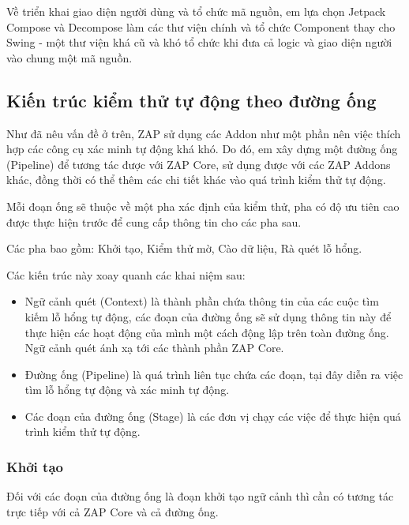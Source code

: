 \documentclass[./../main.tex]{subfiles}
\begin{document}
Về triển khai giao diện người dùng và tổ chức mã nguồn, em lựa chọn
Jetpack Compose và Decompose làm các thư viện chính và tổ chức Component
thay cho Swing - một thư viện khá cũ và khó tổ chức khi đưa cả logic và
giao diện người vào chung một mã nguồn.

\subsection{Kiến trúc kiểm thử tự động theo đường ống}
Như đã nêu vấn đề ở trên, ZAP sử dụng các Addon như một phần nên việc
thích hợp các công cụ xác minh tự động khá khó. Do đó, em xây dựng một
đường ống (Pipeline) để tương tác được với ZAP Core, sử dụng được với các
ZAP Addons khác, đồng thời có thể thêm các chi tiết khác vào quá trình kiểm
thử tự động.

Mỗi đoạn ống sẽ thuộc về một pha xác định của kiểm thử, pha có độ ưu tiên
cao được thực hiện trước để cung cấp thông tin cho các pha sau.

Các pha bao gồm: Khởi tạo, Kiểm thử mờ, Cào dữ liệu, Rà quét lỗ hổng.

Các kiến trúc này xoay quanh các khai niệm sau:
\begin{itemize}
	\item Ngữ cảnh quét (Context) là thành phần chứa thông tin của các cuộc
	      tìm kiếm lỗ hổng tự động, các đoạn của đường ống sẽ sử dụng thông tin này để thực hiện các hoạt động của mình một cách động lập trên toàn đường ống. Ngữ cảnh quét ánh xạ tới các thành phần ZAP Core.
	\item Đường ống (Pipeline) là quá trình liên tục chứa các đoạn, tại đây
	      diễn ra việc tìm lỗ hổng tự động và xác minh tự động.
	\item Các đoạn của đường ống (Stage) là các đơn vị chạy các việc để thực
	      hiện quá trình kiểm thử tự động.
\end{itemize}

\subsubsection{Khởi tạo}

Đối với các đoạn của đường ống là đoạn khởi tạo ngữ cảnh thì cần có tương
tác trực tiếp với cả ZAP Core và cả đường ống.
\end{document}
